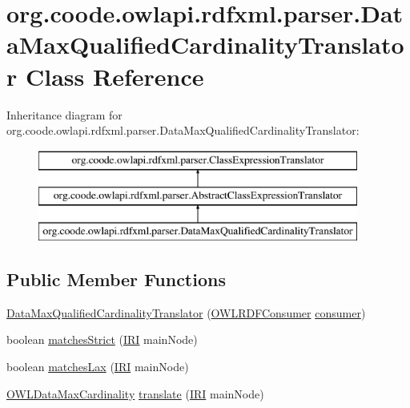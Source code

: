 \hypertarget{classorg_1_1coode_1_1owlapi_1_1rdfxml_1_1parser_1_1_data_max_qualified_cardinality_translator}{\section{org.\-coode.\-owlapi.\-rdfxml.\-parser.\-Data\-Max\-Qualified\-Cardinality\-Translator Class Reference}
\label{classorg_1_1coode_1_1owlapi_1_1rdfxml_1_1parser_1_1_data_max_qualified_cardinality_translator}
}
Inheritance diagram for org.\-coode.\-owlapi.\-rdfxml.\-parser.\-Data\-Max\-Qualified\-Cardinality\-Translator\-:\begin{figure}[H]
\begin{center}
\leavevmode
\includegraphics[height=3.000000cm]{classorg_1_1coode_1_1owlapi_1_1rdfxml_1_1parser_1_1_data_max_qualified_cardinality_translator}
\end{center}
\end{figure}
\subsection*{Public Member Functions}
\begin{DoxyCompactItemize}
\item 
\hyperlink{classorg_1_1coode_1_1owlapi_1_1rdfxml_1_1parser_1_1_data_max_qualified_cardinality_translator_a16c25d36d4b956467c26e487bf17da01}{Data\-Max\-Qualified\-Cardinality\-Translator} (\hyperlink{classorg_1_1coode_1_1owlapi_1_1rdfxml_1_1parser_1_1_o_w_l_r_d_f_consumer}{O\-W\-L\-R\-D\-F\-Consumer} \hyperlink{classorg_1_1coode_1_1owlapi_1_1rdfxml_1_1parser_1_1_abstract_class_expression_translator_ae547084cdd5b92c03835b5aa404f823b}{consumer})
\item 
boolean \hyperlink{classorg_1_1coode_1_1owlapi_1_1rdfxml_1_1parser_1_1_data_max_qualified_cardinality_translator_a7be44159f53cd3718b3b12049cef5d10}{matches\-Strict} (\hyperlink{classorg_1_1semanticweb_1_1owlapi_1_1model_1_1_i_r_i}{I\-R\-I} main\-Node)
\item 
boolean \hyperlink{classorg_1_1coode_1_1owlapi_1_1rdfxml_1_1parser_1_1_data_max_qualified_cardinality_translator_af183fed6efb92b24410edee384b742e7}{matches\-Lax} (\hyperlink{classorg_1_1semanticweb_1_1owlapi_1_1model_1_1_i_r_i}{I\-R\-I} main\-Node)
\item 
\hyperlink{interfaceorg_1_1semanticweb_1_1owlapi_1_1model_1_1_o_w_l_data_max_cardinality}{O\-W\-L\-Data\-Max\-Cardinality} \hyperlink{classorg_1_1coode_1_1owlapi_1_1rdfxml_1_1parser_1_1_data_max_qualified_cardinality_translator_ad745f8751a2a967aa152ab720a494e4d}{translate} (\hyperlink{classorg_1_1semanticweb_1_1owlapi_1_1model_1_1_i_r_i}{I\-R\-I} main\-Node)
\end{DoxyCompactItemize}
